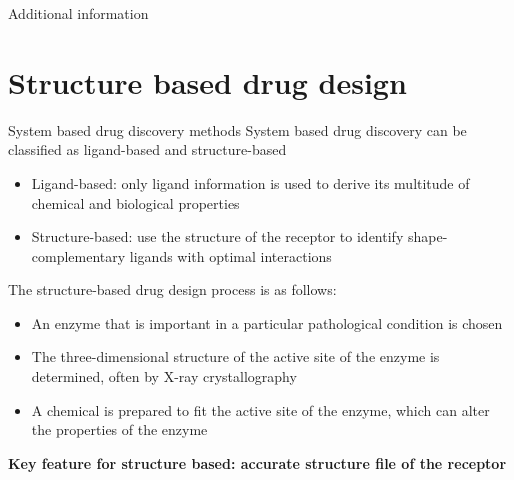 
\appendix

\begin{frame}[label=additional]{Additional information}
  \tableofcontents
\end{frame}



\section{Structure based drug design}
\begin{appendixframe}{System based  drug  discovery methods}
System based  drug  discovery  can  be classified  as  ligand-based  and  structure-based
\begin{itemize}
\item Ligand-based: only  ligand  information  is  used  to  derive  its  multitude  of chemical and biological properties
\item  Structure-based: use the structure of the receptor to identify shape-complementary ligands with optimal interactions
\end{itemize}
The structure-based drug design process is as follows:
\begin{itemize}
\item An enzyme that is important in a particular pathological condition is chosen
\item The three-dimensional structure of the active site of the enzyme is determined, often by X-ray crystallography
\item A chemical is prepared to fit the active site of the enzyme, which can alter the properties of the enzyme
\end{itemize}
\textbf{Key feature for structure based: accurate structure file of the receptor}
\end{appendixframe}





